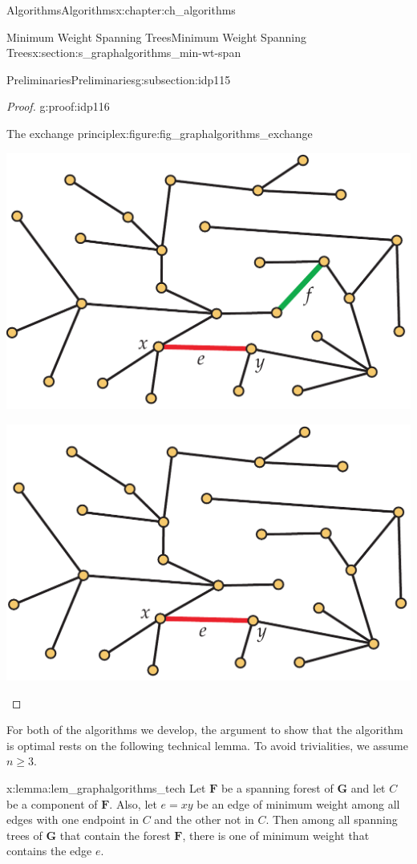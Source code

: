 \documentclass[oneside,10pt,]{book}
\numberwithin{equation}{section}
\newcommand{\bfG}{\mathbf{G}}
\newcommand{\bfF}{\mathbf{F}}
\begin{document}
\begin{chapterptx}{Algorithms}{}{Algorithms}{}{}{x:chapter:ch_algorithms}
\begin{sectionptx}{Minimum Weight Spanning Trees}{}{Minimum Weight Spanning Trees}{}{}{x:section:s_graphalgorithms_min-wt-span}
\begin{subsectionptx}{Preliminaries}{}{Preliminaries}{}{}{g:subsection:idp115}
\begin{proof}{}{g:proof:idp116}
\begin{figureptx}{The exchange principle}{x:figure:fig_graphalgorithms_exchange}{}
\begin{sidebyside}{2}{0.01}{0.01}{0.02}
\begin{sbspanel}{0.48}%
\includegraphics[width=\linewidth]{images/exchange1}
\end{sbspanel}%
\begin{sbspanel}{0.48}%
\includegraphics[width=\linewidth]{images/exchange2}
\end{sbspanel}%
\end{sidebyside}%
\tcblower
\end{figureptx}%
\end{proof}
For both of the algorithms we develop, the argument to show that the algorithm is optimal rests on the following technical lemma. To avoid trivialities, we assume \(n\ge3\).%
\begin{lemma}{}{}{x:lemma:lem_graphalgorithms_tech}%
Let \(\bfF\) be a spanning forest of \(\bfG\) and let \(C\) be a component of \(\bfF\). Also, let \(e=xy\) be an edge of minimum weight among all edges with one endpoint in \(C\) and the other not in \(C\). Then among all spanning trees of \(\bfG\) that contain the forest \(\bfF\), there is one of minimum weight that contains the edge \(e\).%

\end{lemma}
\end{subsectionptx}
\end{sectionptx}
\end{chapterptx}
\end{document}
